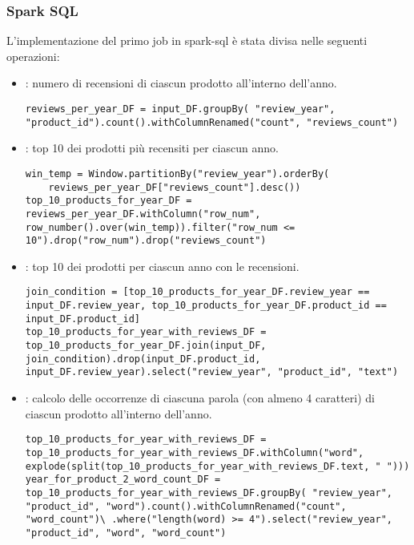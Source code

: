   \subsubsection{Spark SQL}
  L'implementazione del primo job in spark-sql è stata divisa nelle seguenti operazioni:
  \begin{itemize}
    \item {}: numero di recensioni di ciascun prodotto all'interno dell'anno.
  \begin{lstlisting}[style=all, style=PythonStyle]
reviews_per_year_DF = input_DF.groupBy( "review_year", "product_id").count().withColumnRenamed("count", "reviews_count")
  \end{lstlisting}
    \item {}: top 10 dei prodotti più recensiti per ciascun anno.
  \begin{lstlisting}[style=all, style=PythonStyle]
win_temp = Window.partitionBy("review_year").orderBy(
    reviews_per_year_DF["reviews_count"].desc())
top_10_products_for_year_DF = reviews_per_year_DF.withColumn("row_num", row_number().over(win_temp)).filter("row_num <= 10").drop("row_num").drop("reviews_count")
\end{lstlisting}
  \item {}: top 10 dei prodotti per ciascun anno con le recensioni.
     \begin{lstlisting}[style=all, style=PythonStyle]
join_condition = [top_10_products_for_year_DF.review_year == input_DF.review_year, top_10_products_for_year_DF.product_id == input_DF.product_id]
top_10_products_for_year_with_reviews_DF = top_10_products_for_year_DF.join(input_DF, join_condition).drop(input_DF.product_id, input_DF.review_year).select("review_year", "product_id", "text")
\end{lstlisting}

    \item {}: calcolo delle occorrenze di ciascuna parola (con almeno 4 caratteri) di ciascun prodotto all'interno dell'anno.
     \begin{lstlisting}[style=all, style=PythonStyle]
top_10_products_for_year_with_reviews_DF = top_10_products_for_year_with_reviews_DF.withColumn("word", explode(split(top_10_products_for_year_with_reviews_DF.text, " ")))
year_for_product_2_word_count_DF = top_10_products_for_year_with_reviews_DF.groupBy( "review_year", "product_id", "word").count().withColumnRenamed("count", "word_count")\ .where("length(word) >= 4").select("review_year", "product_id", "word", "word_count")
\end{lstlisting}


\end{itemize}
